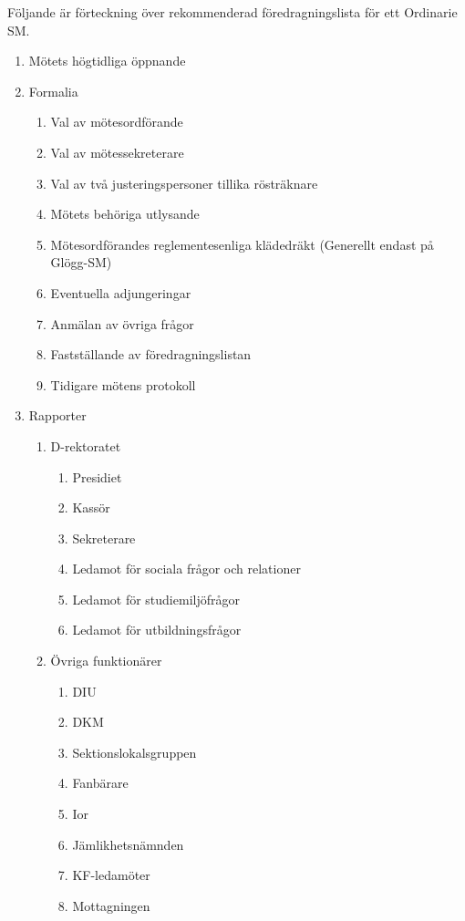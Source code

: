 \documentclass{dgovdoc}
\begin{document}
Följande är förteckning över rekommenderad föredragningslista för ett Ordinarie SM.

\begin{enumerate}
  \item Mötets högtidliga öppnande
  \item Formalia
  \begin{enumerate}
      \item Val av mötesordförande
      \item Val av mötessekreterare
      \item Val av två justeringspersoner tillika rösträknare
      \item Mötets behöriga utlysande
      \item Mötesordförandes reglementesenliga klädedräkt (Generellt endast på Glögg-SM)
      \item Eventuella adjungeringar
      \item Anmälan av övriga frågor
      \item Fastställande av föredragningslistan
      \item Tidigare mötens protokoll
  \end{enumerate}
  \item Rapporter
  \begin{enumerate}
      \item D-rektoratet
      \begin{enumerate}
          \item Presidiet
          \item Kassör
          \item Sekreterare
          \item Ledamot för sociala frågor och relationer
          \item Ledamot för studiemiljöfrågor
          \item Ledamot för utbildningsfrågor
      \end{enumerate}
      \item Övriga funktionärer
      \begin{enumerate}
          \item DIU
          \item DKM
          \item Sektionslokalsgruppen
          \item Fanbärare
          \item Ior
          \item Jämlikhetsnämnden
          \item KF-ledamöter
          \item Mottagningen

\end{enumerate}
\end{enumerate}
\end{enumerate}
\end{document}
